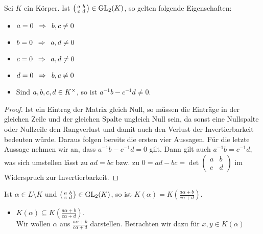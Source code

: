 \begin{exercisePage}
    \setcounter{taskcount}{6}
    
    \newcommand{\bruch}{\frac{a \alpha + b}{c \alpha + d}}
    \newcommand{\mymatrix}{ \left( \begin{smallmatrix} a & b \\ c & d \end{smallmatrix} \right)}
    
    \begin{lemma}\label{lemma: 1_7_invertierbarkeit}
        Sei $K$ ein Körper. Ist $\mymatrix \in \GL_2(K)$, so gelten folgende Eigenschaften:
        \begin{itemize}[leftmargin=*, nolistsep, topsep=-\parskip]
            \item $a = 0 \enskip \Rightarrow \enskip b,c \neq 0$ 
            \item $b = 0 \enskip \Rightarrow \enskip a,d \neq 0$
            \item $c = 0 \enskip \Rightarrow \enskip a,d \neq 0$
            \item $d = 0 \enskip \Rightarrow \enskip b,c \neq 0$
            \item Sind $a,b,c,d \in {K}^{\times}$, so ist $a^{-1} b - c^{-1} d \neq 0$.
        \end{itemize}
    \end{lemma}
    \begin{proof}
        Ist ein Eintrag der Matrix gleich Null, so müssen die Einträge in der gleichen Zeile und der gleichen Spalte ungleich Null sein, da sonst eine Nullspalte oder Nullzeile den Rangverlust und damit auch den Verlust der Invertierbarkeit bedeuten würde. Daraus folgen bereits die ersten vier Aussagen. Für die letzte Aussage nehmen wir an, dass $a^{-1} b - c^{-1} d = 0$ gilt. Dann gilt auch $a^{-1} b = c^{-1} d$, was sich umstellen lässt zu $ad = bc$ bzw. zu $0 = ad - bc = \det\mymatrix$ im Widerspruch zur Invertierbarkeit.
    \end{proof}
    \begin{exercise}
        Ist $\alpha \in L \setminus K$ und $\mymatrix \in \GL_2(K)$, so ist $K(\alpha) = K\left( \bruch \right)$.
    \end{exercise}
    \begin{itemize}[leftmargin=*]
        \item $K(\alpha) \subseteq K(\bruch)$. \\
        Wir wollen $\alpha$ aus $\bruch$ darstellen. Betrachten wir dazu für $x,y \in K(\alpha)$

\end{itemize}
\end{exercisePage}
